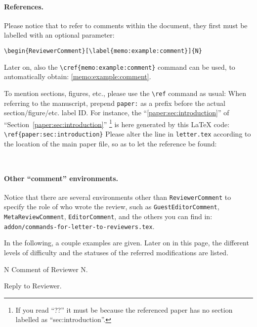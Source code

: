 \begin{Answer}
\begin{sloppypar}
\paragraph{References.}
Please notice that to refer to comments within the document, they first must be labelled with an optional parameter:
\begin{verbatim}
\begin{ReviewerComment}[\label{memo:example:comment}]{N}
\end{verbatim}
Later on, also the \verb|\cref{memo:example:comment}| command can be used, to automatically obtain: \cref{memo:example:comment}.

To mention sections, figures, etc., please use the \verb|\ref| command as usual: When referring to the manuscript, prepend \verb|paper:| as a prefix before the actual section/figure/etc. label ID. For instance, the ``\ref{paper:sec:introduction}'' of ``Section~\ref{paper:sec:introduction}''%
\footnote{If you read ``??'' it must be because the referenced paper has no section labelled as ``sec:introduction''.
}
is here generated by this {\LaTeX} code:
\verb|\ref{paper:sec:introduction}|
%
Please alter the line in \texttt{letter.tex} according to the location of the main paper file, so as to let the reference be found:
\begin{verbatim}
	
\end{verbatim}
%
\paragraph{Other ``comment'' environments.}
Notice that there are several environments other than \verb|ReviewerComment| to specify the role of who wrote the review, such as \verb|GuestEditorComment|, \verb|MetaReviewComment|, \verb|EditorComment|, and the others you can find in:\\
\texttt{addon/commands-for-letter-to-reviewers.tex}.
\end{sloppypar}
In the following, a couple examples are given. Later on in this page, the different levels of difficulty and the statuses of the referred modifications are listed.
\end{Answer}
%
%
\begin{ReviewerComment}{N}
	Comment of Reviewer N.
\end{ReviewerComment}
%
\begin{Answer}
	Reply to Reviewer.
	 \NotEstimatedRevTask
\end{Answer}
